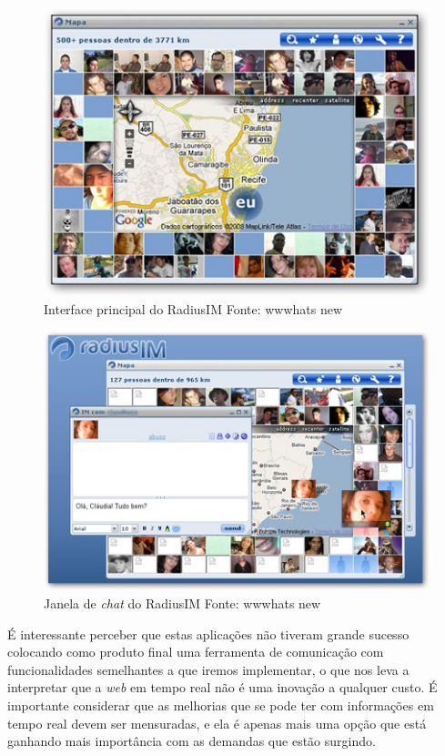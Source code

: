 \begin{figure}[H]
	\centering
	\includegraphics[scale=0.9]{imagens/radiusim.jpg}
	\caption{\small Interface principal do RadiusIM Fonte: wwwhats new \cite{radiusim}}
	\label{fig:radiusim-principal}
\end{figure}

\begin{figure}[H]
	\centering
	\includegraphics[scale=0.9]{imagens/radiusim2.jpg}
	\caption{\small Janela de \textit{chat} do RadiusIM Fonte: wwwhats new \cite{radiusim}}
	\label{fig:radiusim-chat}
\end{figure}

É interessante perceber que estas aplicações não tiveram grande sucesso colocando como produto final uma ferramenta de comunicação com funcionalidades semelhantes a que iremos implementar, o que nos leva a interpretar que a \textit{web} em tempo real não é uma inovação a qualquer custo. É importante considerar que as melhorias que se pode ter com informações em tempo real devem ser mensuradas, e ela é apenas mais uma opção que está ganhando mais importância com as demandas que estão surgindo.

